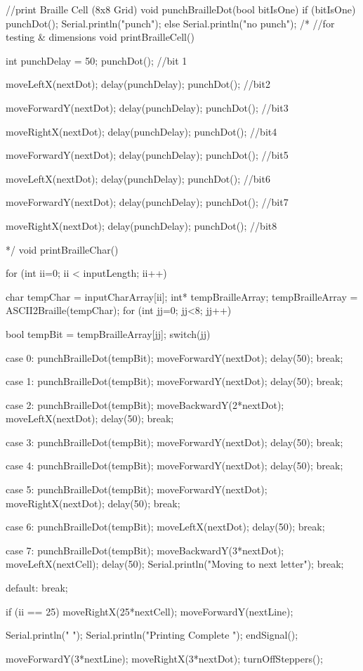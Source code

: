 //print Braille Cell (8x8 Grid)
void punchBrailleDot(bool bitIsOne){
  if (bitIsOne){
    punchDot();
    Serial.println("punch");
  }
  else Serial.println("no punch");
}
/*
//for testing & dimensions
void printBrailleCell(){
  int punchDelay = 50;
  punchDot();  //bit 1

  moveLeftX(nextDot);
  delay(punchDelay);
  punchDot();  //bit2

  moveForwardY(nextDot);
  delay(punchDelay);
  punchDot();  //bit3

  moveRightX(nextDot);
  delay(punchDelay);
  punchDot();  //bit4

  moveForwardY(nextDot);
  delay(punchDelay);
  punchDot();  //bit5

  moveLeftX(nextDot);
  delay(punchDelay);
  punchDot();  //bit6

  moveForwardY(nextDot);
  delay(punchDelay);
  punchDot();  //bit7

  moveRightX(nextDot);
  delay(punchDelay);
  punchDot();  //bit8
}
*/
void printBrailleChar(){
  for (int ii=0; ii < inputLength; ii++){
    char tempChar = inputCharArray[ii];
    int* tempBrailleArray;
    tempBrailleArray = ASCII2Braille(tempChar);
    for (int jj=0; jj<8; jj++){
      bool tempBit = tempBrailleArray[jj];
      switch(jj){

        case 0: 
        punchBrailleDot(tempBit);
        moveForwardY(nextDot);
        delay(50);
        break;

        case 1:
        punchBrailleDot(tempBit);
        moveForwardY(nextDot);
        delay(50);
        break;

        case 2:
        punchBrailleDot(tempBit);
        moveBackwardY(2*nextDot);
        moveLeftX(nextDot);
        delay(50);
        break;

        case 3:
        punchBrailleDot(tempBit);
        moveForwardY(nextDot);
        delay(50);
        break;
        
        case 4:
        punchBrailleDot(tempBit);
        moveForwardY(nextDot);
        delay(50);
        break;

        case 5:
        punchBrailleDot(tempBit);
        moveForwardY(nextDot);
        moveRightX(nextDot);
        delay(50);
        break;
        
        case 6:
        punchBrailleDot(tempBit);
        moveLeftX(nextDot);
        delay(50);
        break;

        case 7:
        punchBrailleDot(tempBit);
        moveBackwardY(3*nextDot);
        moveLeftX(nextCell);
        delay(50);
        Serial.println("Moving to next letter");
        break;

        default:
        break;
      }
    }
    if (ii == 25){
        moveRightX(25*nextCell);
        moveForwardY(nextLine);
      }
  }
  Serial.println(" "); 
  Serial.println("Printing Complete ");
  endSignal();

  moveForwardY(3*nextLine);
  moveRightX(3*nextDot);
  turnOffSteppers(); 
}

